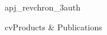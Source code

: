 \documentclass[12pt]{article}
\begin{document}
{apj_revchron_3auth}
%
%
%


{cv}{Products \& Publications}

\vfill  
\nopagebreak



%


% 
% 
% 
% 
% 
% 
% 
% 
% 
% 
% 
% 
% 
% 
% 

%



\end{document}
